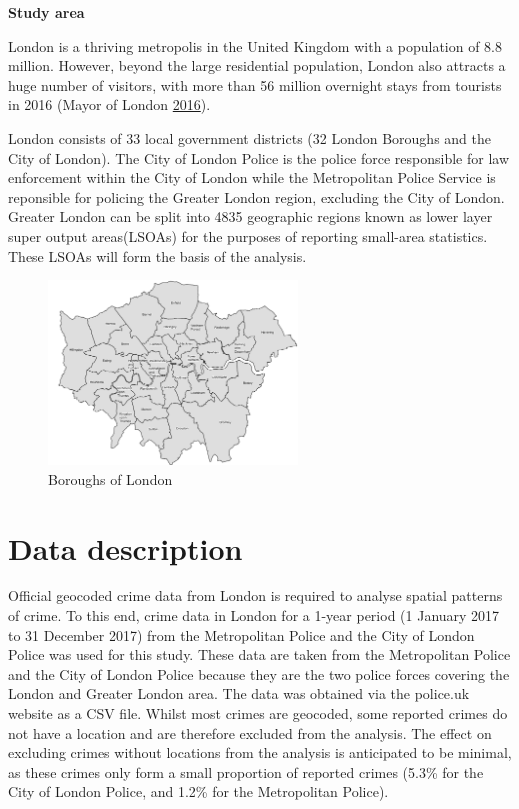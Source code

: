 \documentclass[]{article}
\theoremstyle{definition}
\theoremstyle{definition}
\theoremstyle{definition}
\theoremstyle{remark}
\begin{document}
\textbf{Study area}

London is a thriving metropolis in the United Kingdom with a population
of 8.8 million. However, beyond the large residential population, London
also attracts a huge number of visitors, with more than 56 million
overnight stays from tourists in 2016 (Mayor of London
\protect\hyperlink{ref-MayorofLondon2016}{2016}).

London consists of 33 local government districts (32 London Boroughs and
the City of London). The City of London Police is the police force
responsible for law enforcement within the City of London while the
Metropolitan Police Service is reponsible for policing the Greater
London region, excluding the City of London. Greater London can be split
into 4835 geographic regions known as lower layer super output
areas(LSOAs) for the purposes of reporting small-area statistics. These
LSOAs will form the basis of the analysis.

\begin{figure}
\centering
\includegraphics[width=2.60417in]{pictures/London.png}
\caption{Boroughs of London}
\end{figure}

\pagebreak

\section{Data description}\label{data-description}

Official geocoded crime data from London is required to analyse spatial
patterns of crime. To this end, crime data in London for a 1-year period
(1 January 2017 to 31 December 2017) from the Metropolitan Police and
the City of London Police was used for this study. These data are taken
from the Metropolitan Police and the City of London Police because they
are the two police forces covering the London and Greater London area.
The data was obtained via the police.uk website as a CSV file. Whilst
most crimes are geocoded, some reported crimes do not have a location
and are therefore excluded from the analysis. The effect on excluding
crimes without locations from the analysis is anticipated to be minimal,
as these crimes only form a small proportion of reported crimes (5.3\%
for the City of London Police, and 1.2\% for the Metropolitan Police).
\end{document}
